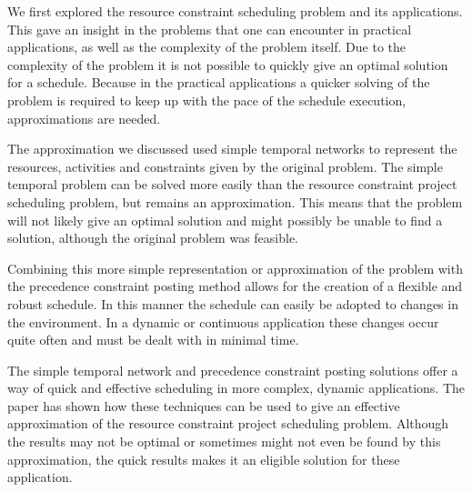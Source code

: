 \documentclass{article}
\theoremstyle{definition}
\begin{document}
We first explored the resource constraint scheduling problem and its applications.
This gave an insight in the problems that one can encounter in practical applications, as well as the complexity of the problem itself.
Due to the complexity of the problem it is not possible to quickly give an optimal solution for a schedule.
Because in the practical applications a quicker solving of the problem is required to keep up with the pace of the schedule execution, approximations are needed.

The approximation we discussed used simple temporal networks to represent the resources, activities and constraints given by the original problem.
The simple temporal problem can be solved more easily than the resource constraint project scheduling problem, but remains an approximation.
This means that the problem will not likely give an optimal solution and might possibly be unable to find a solution, although the original problem was feasible.

Combining this more simple representation or approximation of the problem with the precedence constraint posting method allows for the creation of a flexible and robust schedule.
In this manner the schedule can easily be adopted to changes in the environment.
In a dynamic or continuous application these changes occur quite often and must be dealt with in minimal time.

The simple temporal network and precedence constraint posting solutions offer a way of quick and effective scheduling in more complex, dynamic applications.
The paper has shown how these techniques can be used to give an effective approximation of the resource constraint project scheduling problem.
Although the results may not be optimal or sometimes might not even be found by this approximation, the quick results makes it an eligible solution for these application.

\newpage


\end{document}

